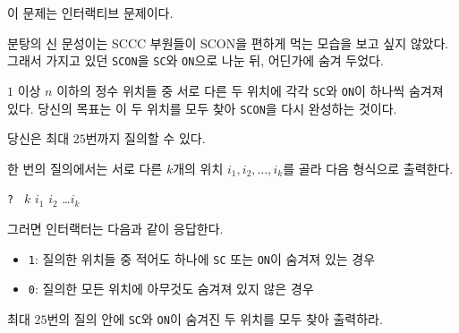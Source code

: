 이 문제는 인터랙티브 문제이다.

분탕의 신 문성이는 SCCC 부원들이 SCON을 편하게 먹는 모습을 보고 싶지 않았다.
그래서 가지고 있던 \texttt{SCON}을 \texttt{SC}와 \texttt{ON}으로 나눈 뒤, 어딘가에 숨겨 두었다.

$1$ 이상 $n$ 이하의 정수 위치들 중 서로 다른 두 위치에 각각 \texttt{SC}와 \texttt{ON}이 하나씩 숨겨져 있다.
당신의 목표는 이 두 위치를 모두 찾아 \texttt{SCON}을 다시 완성하는 것이다.

당신은 최대 $25$번까지 질의할 수 있다.

한 번의 질의에서는 서로 다른 $k$개의 위치
$i_1, i_2, \dots, i_k$를 골라 다음 형식으로 출력한다.
\begin{center}
\texttt{? } $k$ $i_1$ $i_2$ \dots $i_k$
\end{center}

그러면 인터랙터는 다음과 같이 응답한다.
\begin{itemize}
\item \texttt{1}: 질의한 위치들 중 적어도 하나에 \texttt{SC} 또는 \texttt{ON}이 숨겨져 있는 경우
\item \texttt{0}: 질의한 모든 위치에 아무것도 숨겨져 있지 않은 경우
\end{itemize}

최대 $25$번의 질의 안에 \texttt{SC}와 \texttt{ON}이 숨겨진 두 위치를 모두 찾아 출력하라.